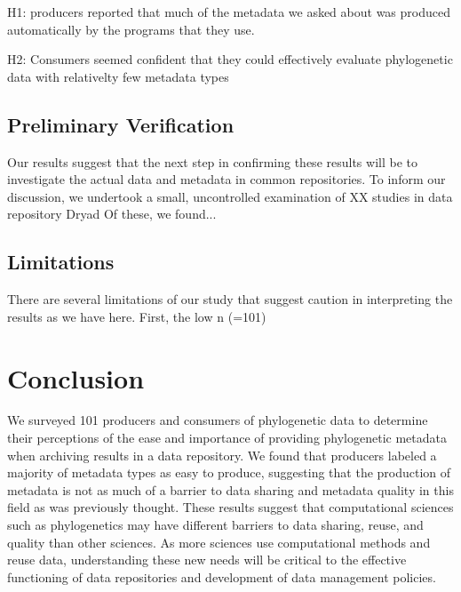 \documentclass[12pt]{scrartcl}
\begin{document}
\begin{multicols}{2}
H1: producers reported that much of the metadata we asked about was produced automatically by the programs that they use.

H2: Consumers seemed confident that they could effectively evaluate phylogenetic data with relativelty few metadata types

\subsection{Preliminary Verification}
Our results suggest that the next step in confirming these results will be to investigate the actual data and metadata in common repositories.  To inform our discussion, we undertook a small, uncontrolled examination of XX%
studies in data repository Dryad %
Of these, we found... %

\subsection{Limitations}
There are several limitations of our study that suggest caution in interpreting the results as we have here.  First, the low n (=101)

\section{Conclusion}

We surveyed 101 producers and consumers of phylogenetic data to determine their perceptions of the ease and importance of providing phylogenetic metadata when archiving results in a data repository.  We found that producers labeled a majority of metadata types as easy to produce, suggesting that the production of metadata is not as much of a barrier to data sharing and metadata quality in this field as was previously thought.  
These results suggest that computational sciences such as phylogenetics may have different barriers to data sharing, reuse, and quality than other sciences.  As more sciences use computational methods and reuse data, understanding these new needs will be critical to the effective functioning of data repositories and development of data management policies.



\end{multicols}
\end{document}
